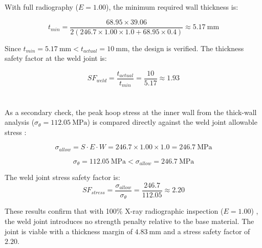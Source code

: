 \documentclass[12pt, letterpaper]{report}%
\begin{document}
            With full radiography ($E = 1.00$), the minimum required wall thickness is:
            
            \begin{equation}
            t_{min} = \frac{68.95 \times 39.06}{2\left(246.7 \times 1.00 \times 1.0 + 68.95 \times 0.4\right)} 
             \approx 5.17 \ \text{mm}
            \label{t_num}
            \end{equation}

            Since $t_{min} = 5.17\ \text{mm} < t_{actual} = 10\ \text{mm}$, the design is verified.
            The thickness safety factor at the weld joint is:
            
            \begin{equation}
            SF_{weld} = \frac{t_{actual}}{t_{min}} = \frac{10}{5.17} \approx 1.93
            \label{sf_weld}    
            \end{equation}
            \\~\\
            As a secondary check, the peak hoop stress at the inner wall from the thick-wall analysis 
            ($\sigma_\theta = 112.05\ \text{MPa}$) is compared directly against the weld joint allowable stress 
            \cite{asme_b313}:
            
            \begin{equation}
            \sigma_{allow} = S \cdot E \cdot W = 246.7 \times 1.00 \times 1.0 = 246.7 \ \text{MPa}
            \label{stress_allow}
            \end{equation}

            \begin{equation}
            \sigma_\theta = 112.05 \ \text{MPa} < \sigma_{allow} = 246.7 \ \text{MPa}
            \label{ineq_hoop}
            \end{equation}

            The weld joint stress safety factor is:
            \begin{equation}
            SF_{stress} = \frac{\sigma_{allow}}{\sigma_\theta} = \frac{246.7}{112.05} \approx 2.20
            \label{sf_stress}    
            \end{equation}
            
            These results confirm that with 100\% X-ray radiographic inspection ($E = 1.00$) \cite{asme_b313}, 
            the weld joint introduces no strength penalty relative to the base material.
            The joint is viable with a thickness margin of $ 4.83\ \text{mm}$ and a stress safety factor of $2.20$.            
        
\end{document}
